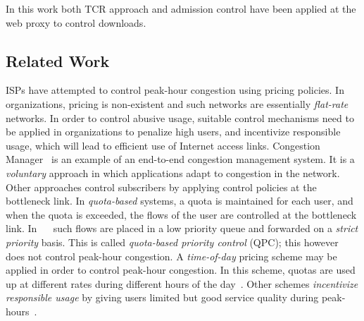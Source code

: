 \documentclass[conference]{../../IEEEtran}
\begin{document}

In this work both TCR approach and admission control have been applied at the web proxy to control downloads. 



\subsection{Related Work}
\label{sec:relwork}

ISPs have attempted to control peak-hour congestion using pricing policies. In organizations, pricing is non-existent and such networks are essentially \emph{flat-rate} networks. In order to control abusive usage, suitable control mechanisms need to be applied in organizations to penalize high users, and incentivize responsible usage, which will lead to efficient use of Internet access links. Congestion Manager~\cite{references:balakrishnan99} is an example of an end-to-end congestion management system. It is a \emph{voluntary} approach in which applications adapt to congestion in the network. Other approaches control subscribers by applying control policies at the bottleneck link. In \emph{quota-based} systems, a quota is maintained for each user, and when the quota is exceeded, the flows of the user are controlled at the bottleneck link. In ~\cite{references:lin}~\cite{references:paine} such flows are placed in a low priority queue and forwarded on a \emph{strict priority} basis. This is called \emph{quota-based priority control} (QPC); this however does not control peak-hour congestion. A \emph{time-of-day} pricing scheme may be applied in order to control peak-hour congestion. In this scheme, quotas are used up at different rates during different hours of the day~\cite{references:chu}. Other schemes \emph{incentivize responsible usage} by giving users limited but good service quality during peak-hours~\cite{references:lee11}. 
\end{document}
